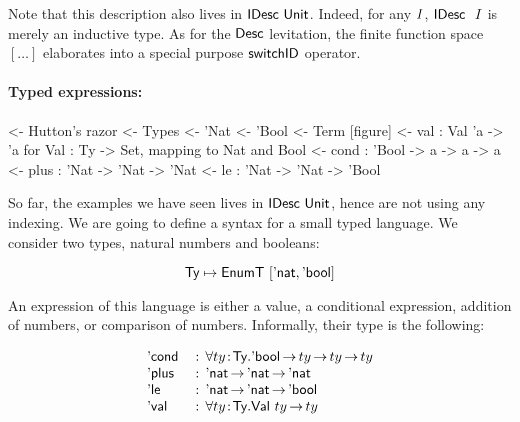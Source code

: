 Note that this description also lives in $\IDesc{\Unit}$. Indeed,
for any $\V{I}$, $\IDesc~\V{I}$ is merely an inductive type. As for the
$\Desc$ levitation, the finite function space $[ \ldots ]$ elaborates into a
special purpose $\F{switchID}$ operator. 

\paragraph{Typed expressions:}

\begin{wstructure}
<- Hutton's razor
    <- Types
        <- 'Nat
        <- 'Bool
    <- Term [figure]
        <- val : Val 'a -> 'a  for Val : Ty -> Set, mapping to Nat and Bool
        <- cond : 'Bool -> a -> a -> a
        <- plus : 'Nat -> 'Nat -> 'Nat
        <- le : 'Nat -> 'Nat -> 'Bool
\end{wstructure}

\newcommand{\Ty}{\C{Ty}}
\newcommand{\Ebool}{\etag{\CN{bool}}}
\newcommand{\Enat}{\etag{\CN{nat}}}

\newcommand{\Eval}[1]{\etag{\CN{val}}~#1}
\newcommand{\Econd}[3]{\etag{\CN{cond}}~#1~#2~#3}
\newcommand{\Eplus}[2]{\etag{\CN{plus}}~#1~#2}
\newcommand{\Ele}[2]{\etag{\CN{le}}~#1~#2}

\newcommand{\Val}[1]{\D{Val}~#1}
\newcommand{\Var}[2]{\D{Var}_{#1}~#2}

\newcommand{\HExprD}{\C{ExprD}}
\newcommand{\HExprAD}{\C{ExprAlwaysD}}
\newcommand{\HExprID}{\C{ExprIndexedD}}
\newcommand{\HExprVarD}[1]{\C{ExprD}_{\C{Var},#1}}
\newcommand{\HExprFreeD}{\C{ExprD}^{\C{Free}}}
\newcommand{\HExprAFreeD}{\C{ExprAlwaysD}^{\C{Free}}}

So far, the examples we have seen lives in $\IDesc{\Unit}$, hence are
not using any indexing. We are going to define a syntax for a small
typed language. We consider two types, natural numbers and booleans:

\[
\Ty \mapsto \EnumT{[\Enat, \Ebool]}
\]

An expression of this language is either a value, a conditional
expression, addition of numbers, or comparison of numbers. Informally,
their type is the following:

\[
\begin{array}{l@{\::\:\:}l}
\Econd{}{}{}     & \forall \Bhab{ty}{\Ty} . \Ebool \To ty \To ty \To ty  \\ 
\Eplus{}{}       & \Enat \To \Enat \To \Enat                           \\
\Ele{}{}         & \Enat \To \Enat \To \Ebool                          \\
\Eval{}          & \forall \Bhab{ty}{\Ty} . \Val{ty} \To ty
\end{array}
\]


